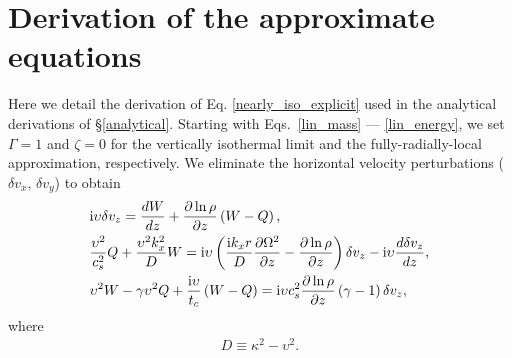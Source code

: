 \section{Derivation of the approximate equations}\label{adia_improve}
Here we detail the derivation of Eq. \ref{nearly_iso_explicit} used in the 
analytical derivations of \S\ref{analytical}.  Starting with Eqs.\ \ref{lin_mass} --- \ref{lin_energy},
we set $\Gamma = 1$ and $\zeta = 0$ for the vertically isothermal limit and the fully-radially-local 
approximation, respectively.  We  eliminate
the horizontal velocity perturbations ($\delta v_x,\, \delta v_y$) to
obtain  
\begin{subequations}\label{A1}\begin{align}
  & \mathrm{i}\upsilon\delta v_z = \frac{dW}{dz} + \frac{\partial\ln{\rho}}{\partial z}\left(W-Q\right),\label{ode_vz} \\
  &\frac{\upsilon^2}{c_s^2}Q + \frac{\upsilon^2k_x^2}{D}W =\mathrm{i}\upsilon \left(\frac{\mathrm{i}
      k_x r}{D}\frac{\partial\Omega^2}{\partial z} -
    \frac{\partial \ln{\rho}}{\partial z}\right)\delta v_z - \mathrm{i}\upsilon \frac{d\delta v_z}{dz},
  \label{ode_w}\\
  &\upsilon^2W - \gamma\upsilon^2 Q +
  \frac{\mathrm{i}\upsilon}{t_c}\left(W-Q\right) 
  =\mathrm{i} \upsilon c_s^2\frac{\partial\ln{\rho}}{\partial z}\left(\gamma -
    1\right)\delta v_z,
  \label{ode_Q} 
\end{align}\end{subequations}
where
\begin{align}
  D \equiv \kappa^2 - \upsilon^2.
\end{align} 
%

